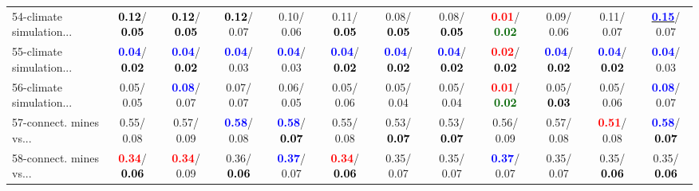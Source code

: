 \begin{table}[h]
\begin{center}
{\begin{tabular}{lc|c|c|c|c|c|c|c|c|c|c}
54-climate simulation... & \textcolor{black}{\textbf{  0.12}}/\textcolor{black}{\textbf{  0.05}} & \textcolor{black}{\textbf{  0.12}}/\textcolor{black}{\textbf{  0.05}} & \textcolor{black}{\textbf{  0.12}}/  0.07 &   0.10/  0.06 &   0.11/\textcolor{black}{\textbf{  0.05}} &   0.08/\textcolor{black}{\textbf{  0.05}} &   0.08/\textcolor{black}{\textbf{  0.05}} & \textcolor{red}{\textbf{  0.01}}/\textcolor{darkgreen}{\textbf{  0.02}} &   0.09/  0.06 &   0.11/  0.07 & \underline{\textcolor{blue}{\textbf{  0.15}}}/  0.07 \\
55-climate simulation... & \textcolor{blue}{\textbf{  0.04}}/\textcolor{black}{\textbf{  0.02}} & \textcolor{blue}{\textbf{  0.04}}/\textcolor{black}{\textbf{  0.02}} & \textcolor{blue}{\textbf{  0.04}}/  0.03 & \textcolor{blue}{\textbf{  0.04}}/  0.03 & \textcolor{blue}{\textbf{  0.04}}/\textcolor{black}{\textbf{  0.02}} & \textcolor{blue}{\textbf{  0.04}}/\textcolor{black}{\textbf{  0.02}} & \textcolor{blue}{\textbf{  0.04}}/\textcolor{black}{\textbf{  0.02}} & \textcolor{red}{\textbf{  0.02}}/\textcolor{black}{\textbf{  0.02}} & \textcolor{blue}{\textbf{  0.04}}/\textcolor{black}{\textbf{  0.02}} & \textcolor{blue}{\textbf{  0.04}}/\textcolor{black}{\textbf{  0.02}} & \textcolor{blue}{\textbf{  0.04}}/  0.03 \\
56-climate simulation... &   0.05/  0.05 & \textcolor{blue}{\textbf{  0.08}}/  0.07 &   0.07/  0.07 &   0.06/  0.05 &   0.05/  0.06 &   0.05/  0.04 &   0.05/  0.04 & \textcolor{red}{\textbf{  0.01}}/\textcolor{darkgreen}{\textbf{  0.02}} &   0.05/\textcolor{black}{\textbf{  0.03}} &   0.05/  0.06 & \textcolor{blue}{\textbf{  0.08}}/  0.07 \\
57-connect. mines vs... &   0.55/  0.08 &   0.57/  0.09 & \textcolor{blue}{\textbf{  0.58}}/  0.08 & \textcolor{blue}{\textbf{  0.58}}/\textcolor{black}{\textbf{  0.07}} &   0.55/  0.08 &   0.53/\textcolor{black}{\textbf{  0.07}} &   0.53/\textcolor{black}{\textbf{  0.07}} &   0.56/  0.09 &   0.57/  0.08 & \textcolor{red}{\textbf{  0.51}}/  0.08 & \textcolor{blue}{\textbf{  0.58}}/\textcolor{black}{\textbf{  0.07}} \\
58-connect. mines vs... & \textcolor{red}{\textbf{  0.34}}/\textcolor{black}{\textbf{  0.06}} & \textcolor{red}{\textbf{  0.34}}/  0.09 &   0.36/\textcolor{black}{\textbf{  0.06}} & \textcolor{blue}{\textbf{  0.37}}/  0.07 & \textcolor{red}{\textbf{  0.34}}/\textcolor{black}{\textbf{  0.06}} &   0.35/  0.07 &   0.35/  0.07 & \textcolor{blue}{\textbf{  0.37}}/  0.07 &   0.35/  0.07 &   0.35/\textcolor{black}{\textbf{  0.06}} &   0.35/\textcolor{black}{\textbf{  0.06}} \\

\end{tabular}}
\end{center}
\end{table}
